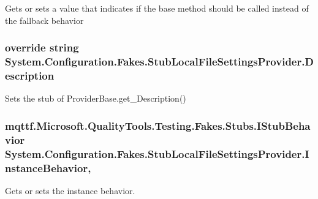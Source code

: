 Gets or sets a value that indicates if the base method should be called instead of the fallback behavior

\hypertarget{class_system_1_1_configuration_1_1_fakes_1_1_stub_local_file_settings_provider_af040d07048cc52477eab2f9e46f51d53}{
\subsubsection[{Description}]{\setlength{\rightskip}{0pt plus 5cm}override string System.\-Configuration.\-Fakes.\-Stub\-Local\-File\-Settings\-Provider.\-Description\hspace{0.3cm}{\ttfamily [get]}}}\label{class_system_1_1_configuration_1_1_fakes_1_1_stub_local_file_settings_provider_af040d07048cc52477eab2f9e46f51d53}


Sets the stub of Provider\-Base.\-get\-\_\-\-Description()

\hypertarget{class_system_1_1_configuration_1_1_fakes_1_1_stub_local_file_settings_provider_a35c067ec03225f98b3e78ba7bb88ea03}{
\subsubsection[{Instance\-Behavior}]{\setlength{\rightskip}{0pt plus 5cm}mqttf.\-Microsoft.\-Quality\-Tools.\-Testing.\-Fakes.\-Stubs.\-I\-Stub\-Behavior System.\-Configuration.\-Fakes.\-Stub\-Local\-File\-Settings\-Provider.\-Instance\-Behavior\hspace{0.3cm}{\ttfamily [get]}, {\ttfamily [set]}}}\label{class_system_1_1_configuration_1_1_fakes_1_1_stub_local_file_settings_provider_a35c067ec03225f98b3e78ba7bb88ea03}


Gets or sets the instance behavior.

